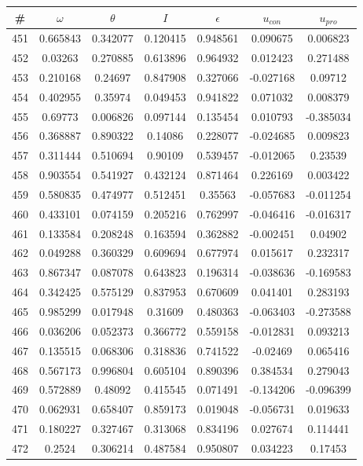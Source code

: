 \begin{table}
\begin{tabular}{c|c|c|c|c|c|c}
\# & $\omega$ & $\theta$ & $I$ & $\epsilon$ & $u_{con}$ & $u_{pro}$\\
\hline
451 & 0.665843 & 0.342077 & 0.120415 & 0.948561 & 0.090675 & 0.006823\\
452 & 0.03263 & 0.270885 & 0.613896 & 0.964932 & 0.012423 & 0.271488\\
453 & 0.210168 & 0.24697 & 0.847908 & 0.327066 & -0.027168 & 0.09712\\
454 & 0.402955 & 0.35974 & 0.049453 & 0.941822 & 0.071032 & 0.008379\\
455 & 0.69773 & 0.006826 & 0.097144 & 0.135454 & 0.010793 & -0.385034\\
456 & 0.368887 & 0.890322 & 0.14086 & 0.228077 & -0.024685 & 0.009823\\
457 & 0.311444 & 0.510694 & 0.90109 & 0.539457 & -0.012065 & 0.23539\\
458 & 0.903554 & 0.541927 & 0.432124 & 0.871464 & 0.226169 & 0.003422\\
459 & 0.580835 & 0.474977 & 0.512451 & 0.35563 & -0.057683 & -0.011254\\
460 & 0.433101 & 0.074159 & 0.205216 & 0.762997 & -0.046416 & -0.016317\\
461 & 0.133584 & 0.208248 & 0.163594 & 0.362882 & -0.002451 & 0.04902\\
462 & 0.049288 & 0.360329 & 0.609694 & 0.677974 & 0.015617 & 0.232317\\
463 & 0.867347 & 0.087078 & 0.643823 & 0.196314 & -0.038636 & -0.169583\\
464 & 0.342425 & 0.575129 & 0.837953 & 0.670609 & 0.041401 & 0.283193\\
465 & 0.985299 & 0.017948 & 0.31609 & 0.480363 & -0.063403 & -0.273588\\
466 & 0.036206 & 0.052373 & 0.366772 & 0.559158 & -0.012831 & 0.093213\\
467 & 0.135515 & 0.068306 & 0.318836 & 0.741522 & -0.02469 & 0.065416\\
468 & 0.567173 & 0.996804 & 0.605104 & 0.890396 & 0.384534 & 0.279043\\
469 & 0.572889 & 0.48092 & 0.415545 & 0.071491 & -0.134206 & -0.096399\\
470 & 0.062931 & 0.658407 & 0.859173 & 0.019048 & -0.056731 & 0.019633\\
471 & 0.180227 & 0.327467 & 0.313068 & 0.834196 & 0.027674 & 0.114441\\
472 & 0.2524 & 0.306214 & 0.487584 & 0.950807 & 0.034223 & 0.17453\\

\end{tabular}
\end{table}
